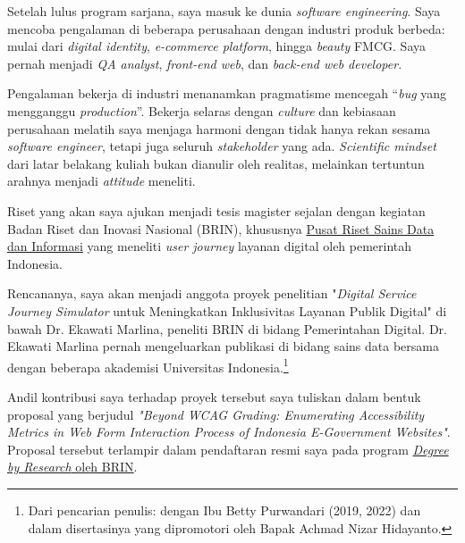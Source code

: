 \documentclass[12pt,a4paper]{article}
\begin{document}
\vspace{\baselineskip}
Setelah lulus program sarjana, saya masuk ke dunia \emph{software
engineering}. Saya mencoba pengalaman di beberapa perusahaan dengan
industri produk berbeda: mulai dari \emph{digital identity}, \emph{e-commerce platform}, hingga
\emph{beauty} FMCG. Saya pernah menjadi \emph{QA analyst}, \emph{front-end web}, dan \emph{back-end web developer}.

Pengalaman bekerja di industri menanamkan pragmatisme mencegah
``\emph{bug} yang mengganggu \emph{production}''.
Bekerja selaras dengan \emph{culture} dan kebiasaan perusahaan melatih saya menjaga harmoni dengan tidak hanya rekan sesama
\emph{software engineer}, tetapi juga seluruh \emph{stakeholder} yang ada. \emph{Scientific mindset} dari latar belakang kuliah bukan dianulir oleh 
realitas, melainkan tertuntun arahnya menjadi \emph{attitude} meneliti.

\vspace{\baselineskip}
Riset yang akan saya ajukan menjadi tesis magister sejalan dengan kegiatan Badan Riset dan Inovasi Nasional (BRIN),
khususnya \href{https://brin.go.id/orei/pusat-riset-sains-data-dan-informasi/page/kelompok-riset-pusat-sains-data-dan-informasi}{Pusat 
Riset Sains Data dan Informasi} yang meneliti \emph{user journey} layanan digital oleh pemerintah
Indonesia.

Rencananya, saya akan menjadi anggota proyek penelitian
"\emph{Digital Service Journey Simulator} untuk Meningkatkan Inklusivitas Layanan Publik Digital"
di bawah Dr. Ekawati Marlina, peneliti BRIN di bidang Pemerintahan Digital.
Dr. Ekawati Marlina pernah mengeluarkan publikasi di bidang sains data bersama dengan beberapa akademisi 
Universitas Indonesia.\footnote{Dari pencarian penulis: dengan Ibu Betty Purwandari (2019, 2022) dan dalam disertasinya yang dipromotori oleh 
Bapak Achmad Nizar Hidayanto.}

Andil kontribusi saya terhadap proyek tersebut saya tuliskan dalam bentuk proposal yang berjudul
\emph{"Beyond WCAG Grading: Enumerating Accessibility Metrics in Web Form Interaction Process of
Indonesia E-Government Websites"}.
Proposal tersebut terlampir dalam pendaftaran resmi saya pada program \href{https://byresearch.brin.go.id/}{\emph{Degree by Research} oleh BRIN}.
\end{document}
